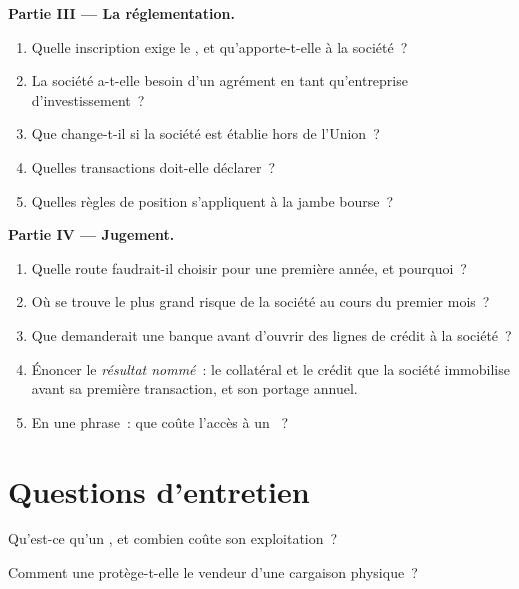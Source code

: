 \begin{problem}
\medskip\noindent\textbf{Partie III --- La réglementation.}
\begin{enumerate}[resume]
\item Quelle inscription exige le , et qu'apporte-t-elle à la société~?
\item La société a-t-elle besoin d'un agrément en tant qu'entreprise d'investissement~?
\item Que change-t-il si la société est établie hors de l'Union~?
\item Quelles transactions doit-elle déclarer~?
\item Quelles règles de position s'appliquent à la jambe bourse~?
\end{enumerate}

\medskip\noindent\textbf{Partie IV --- Jugement.}
\begin{enumerate}[resume]
\item Quelle route faudrait-il choisir pour une première année, et pourquoi~?
\item Où se trouve le plus grand risque de la société au cours du premier mois~?
\item Que demanderait une banque avant d'ouvrir des lignes de crédit à la société~?
\item Énoncer le \emph{résultat nommé}~: le collatéral et le crédit que la société immobilise avant sa première transaction, et son
portage annuel.
\item En une phrase~: que coûte l'accès à un ~?
\end{enumerate}
\end{problem}

\section{Questions d'entretien}

\begin{interviewq}\label{iq:m3:getting-access-commodities-and-power:1}
Qu'est-ce qu'un , et combien coûte son exploitation~?
\end{interviewq}

\begin{interviewq}\label{iq:m3:getting-access-commodities-and-power:2}
Comment une  protège-t-elle le vendeur d'une cargaison physique~?
\end{interviewq}


